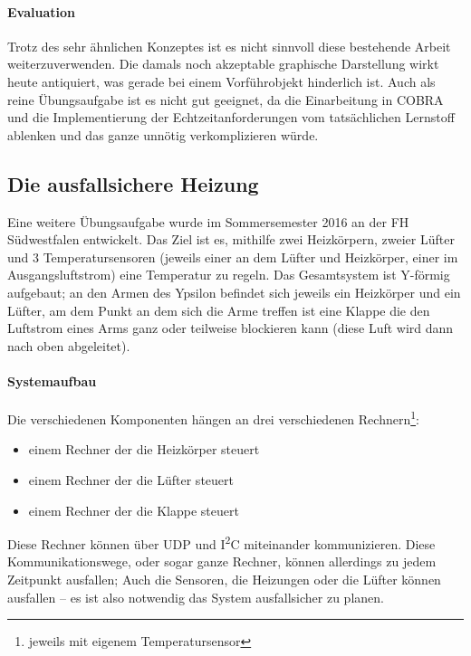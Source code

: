 \documentclass[
    12pt,
    bibliography=totoc,
    ngerman
]{scrartcl}
\begin{document}

\paragraph{Evaluation} Trotz des sehr {\"{a}}hnlichen Konzeptes ist es nicht sinnvoll diese bestehende Arbeit weiterzuverwenden.
Die damals noch akzeptable graphische Darstellung wirkt heute antiquiert, was gerade bei einem Vorf{\"{u}}hrobjekt hinderlich
ist. Auch als reine {\"{U}}bungsaufgabe ist es nicht gut geeignet, da die Einarbeitung in COBRA und die Implementierung der
Echtzeitanforderungen vom tats{\"{a}}chlichen Lernstoff ablenken und das ganze unn{\"{o}}tig verkomplizieren w{\"{u}}rde.

\subsection{Die ausfallsichere Heizung}
Eine weitere {\"{U}}bungsaufgabe wurde im Sommersemester 2016 an der FH S{\"{u}}dwestfalen entwickelt. Das Ziel ist es, mithilfe zwei Heizk{\"{o}}rpern, zweier
L{\"{u}}fter und 3 Temperatursensoren (jeweils einer an dem L{\"{u}}fter und Heizk{\"{o}}rper, einer im Ausgangsluftstrom) eine Temperatur zu regeln.
Das Gesamtsystem ist Y-f{\"{o}}rmig aufgebaut; an den Armen des Ypsilon befindet sich jeweils ein Heizk{\"{o}}rper und ein L{\"{u}}fter, am dem Punkt an dem sich
die Arme treffen ist eine Klappe die den Luftstrom eines Arms ganz oder teilweise blockieren kann (diese Luft wird dann nach oben abgeleitet).

\paragraph{Systemaufbau} Die verschiedenen Komponenten h{\"{a}}ngen an drei verschiedenen Rechnern\footnote{jeweils mit eigenem Temperatursensor}:
\begin{itemize}
\item einem Rechner der die Heizk{\"{o}}rper steuert
\item einem Rechner der die L{\"{u}}fter steuert
\item einem Rechner der die Klappe steuert
\end{itemize}

Diese Rechner k{\"{o}}nnen {\"{u}}ber UDP und I\textsuperscript{2}C miteinander kommunizieren. Diese Kommunikationswege, oder sogar ganze Rechner, k{\"{o}}nnen
allerdings zu jedem Zeitpunkt ausfallen; Auch die Sensoren, die Heizungen oder die L{\"{u}}fter k{\"{o}}nnen ausfallen -- es ist also notwendig das System ausfallsicher zu planen.
\end{document}
